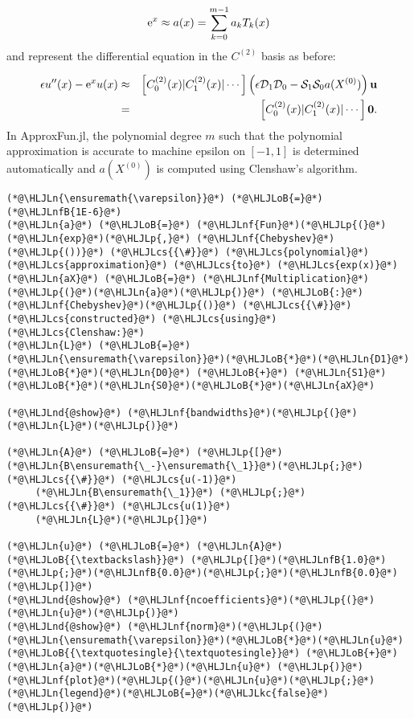 \documentclass[12pt,landscape]{article}
\newcommand{\HLJLkc}[1]{\textcolor[RGB]{59,151,46}{\textit{#1}}}
\newcommand{\HLJLn}[1]{#1}
\newcommand{\HLJLnd}[1]{\textcolor[RGB]{214,102,97}{#1}}
\newcommand{\HLJLnf}[1]{\textcolor[RGB]{66,102,213}{#1}}
\newcommand{\HLJLnfB}[1]{\textcolor[RGB]{59,151,46}{#1}}
\newcommand{\HLJLoB}[1]{\textcolor[RGB]{102,102,102}{\textbf{#1}}}
\newcommand{\HLJLp}[1]{#1}
\newcommand{\HLJLcs}[1]{\textcolor[RGB]{153,153,119}{\textit{#1}}}
\begin{document}
{\[
{\rm e}^{x} \approx a(x) = \sum_{k = 0}^{m-1} a_kT_k(x)
\]
and represent the differential equation in the $C^{(2)}$ basis  as before:


\begin{eqnarray*}
\epsilon u''(x) - {\rm e}^{x}u(x)  &\approx & \left[ C_0^{(2)}(x) | C_1^{(2)}(x) | \cdots \right]\left(\epsilon\mathcal{D}_1\mathcal{D}_0  - \mathcal{S}_1\mathcal{S}_0a(X^{(0)})  \right) \mathbf{u} \\
 &=& \left[ C_0^{(2)}(x) | C_1^{(2)}(x) | \cdots \right]\mathbf{0}.
 \end{eqnarray*}
In ApproxFun.jl, the polynomial degree $m$ such that the polynomial approximation is accurate to machine epsilon on $[-1, 1]$ is determined automatically and $a(X^{(0)})$ is computed using Clenshaw's algorithm.


\begin{lstlisting}
(*@\HLJLn{\ensuremath{\varepsilon}}@*) (*@\HLJLoB{=}@*) (*@\HLJLnfB{1E-6}@*)
(*@\HLJLn{a}@*) (*@\HLJLoB{=}@*) (*@\HLJLnf{Fun}@*)(*@\HLJLp{(}@*)(*@\HLJLn{exp}@*)(*@\HLJLp{,}@*) (*@\HLJLnf{Chebyshev}@*)(*@\HLJLp{())}@*) (*@\HLJLcs{{\#}}@*) (*@\HLJLcs{polynomial}@*) (*@\HLJLcs{approximation}@*) (*@\HLJLcs{to}@*) (*@\HLJLcs{exp(x)}@*)
(*@\HLJLn{aX}@*) (*@\HLJLoB{=}@*) (*@\HLJLnf{Multiplication}@*)(*@\HLJLp{(}@*)(*@\HLJLn{a}@*)(*@\HLJLp{)}@*) (*@\HLJLoB{:}@*) (*@\HLJLnf{Chebyshev}@*)(*@\HLJLp{()}@*) (*@\HLJLcs{{\#}}@*) (*@\HLJLcs{constructed}@*) (*@\HLJLcs{using}@*) (*@\HLJLcs{Clenshaw:}@*)
(*@\HLJLn{L}@*) (*@\HLJLoB{=}@*) (*@\HLJLn{\ensuremath{\varepsilon}}@*)(*@\HLJLoB{*}@*)(*@\HLJLn{D1}@*)(*@\HLJLoB{*}@*)(*@\HLJLn{D0}@*) (*@\HLJLoB{+}@*) (*@\HLJLn{S1}@*)(*@\HLJLoB{*}@*)(*@\HLJLn{S0}@*)(*@\HLJLoB{*}@*)(*@\HLJLn{aX}@*)

(*@\HLJLnd{@show}@*) (*@\HLJLnf{bandwidths}@*)(*@\HLJLp{(}@*)(*@\HLJLn{L}@*)(*@\HLJLp{)}@*)

(*@\HLJLn{A}@*) (*@\HLJLoB{=}@*) (*@\HLJLp{[}@*)(*@\HLJLn{B\ensuremath{\_-}\ensuremath{\_1}}@*)(*@\HLJLp{;}@*)   (*@\HLJLcs{{\#}}@*) (*@\HLJLcs{u(-1)}@*)
     (*@\HLJLn{B\ensuremath{\_1}}@*) (*@\HLJLp{;}@*)   (*@\HLJLcs{{\#}}@*) (*@\HLJLcs{u(1)}@*)
     (*@\HLJLn{L}@*)(*@\HLJLp{]}@*) 

(*@\HLJLn{u}@*) (*@\HLJLoB{=}@*) (*@\HLJLn{A}@*) (*@\HLJLoB{{\textbackslash}}@*) (*@\HLJLp{[}@*)(*@\HLJLnfB{1.0}@*)(*@\HLJLp{;}@*)(*@\HLJLnfB{0.0}@*)(*@\HLJLp{;}@*)(*@\HLJLnfB{0.0}@*)(*@\HLJLp{]}@*)
(*@\HLJLnd{@show}@*) (*@\HLJLnf{ncoefficients}@*)(*@\HLJLp{(}@*)(*@\HLJLn{u}@*)(*@\HLJLp{)}@*)
(*@\HLJLnd{@show}@*) (*@\HLJLnf{norm}@*)(*@\HLJLp{(}@*)(*@\HLJLn{\ensuremath{\varepsilon}}@*)(*@\HLJLoB{*}@*)(*@\HLJLn{u}@*)(*@\HLJLoB{{\textquotesingle}{\textquotesingle}}@*) (*@\HLJLoB{+}@*) (*@\HLJLn{a}@*)(*@\HLJLoB{*}@*)(*@\HLJLn{u}@*) (*@\HLJLp{)}@*)
(*@\HLJLnf{plot}@*)(*@\HLJLp{(}@*)(*@\HLJLn{u}@*)(*@\HLJLp{;}@*) (*@\HLJLn{legend}@*)(*@\HLJLoB{=}@*)(*@\HLJLkc{false}@*)(*@\HLJLp{)}@*)
\end{lstlisting}

}
\end{document}
